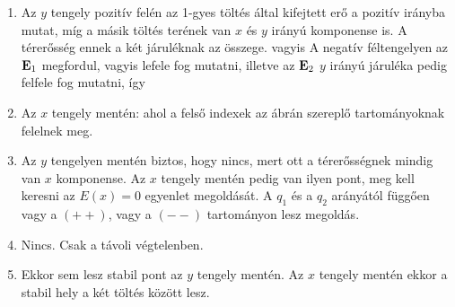  \begin{enumerate}[label=\alph*),itemsep=0pt]
  \item 
   Az $y$ tengely pozitív felén az 1-gyes töltés által kifejtett erő a pozitív irányba mutat, míg a másik töltés terének van $x$ és $y$ irányú komponense is. A térerősség ennek a két járuléknak az összege.
   vagyis
   A negatív féltengelyen az $\mathbf{E}_1$ megfordul, vagyis lefele fog mutatni, illetve az $\mathbf{E}_2$ $y$ irányú járuléka pedig felfele fog mutatni, így 
   
  \item
   Az $x$ tengely mentén:
   ahol a felső indexek az ábrán szereplő tartományoknak felelnek meg. 
   
  \item
   
   Az $y$ tengelyen mentén biztos, hogy nincs, mert ott a térerősségnek mindig van $x$ komponense. Az $x$ tengely mentén pedig van ilyen pont, meg kell keresni az $E(x)=0$ egyenlet megoldását. A $q_1$ és a $q_2$ arányától függően vagy a $(++)$, vagy a $(--)$ tartományon lesz megoldás.
   
  \item 
   Nincs. Csak a távoli végtelenben. 
   
  \item 
   Ekkor sem lesz stabil pont az $y$ tengely mentén. Az $x$ tengely mentén ekkor a stabil hely a két töltés között lesz. 
 \end{enumerate}

\fi